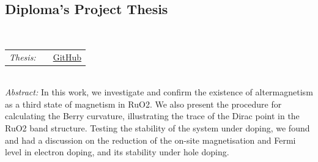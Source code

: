 \documentclass[letterpaper,11pt]{article}
\begin{document}
\subsection*{Diploma's Project Thesis}
\vspace{-5pt}
\hspace{0.5cm}{Altermagnetism in RuO\(_2\)}\\
\hspace{0.6cm}\begin{tabular}{l c r}
	\textit{Thesis: } & \hspace{0.2cm} \null& \href{https://github.com/VCDPhuong/Diploma-Thesis/blob/main/Thesis.pdf}{\faGithub \hspace{.5pt}\color{blue}GitHub}\\
\end{tabular}\\
\hspace{0.6cm}\textit{Abstract: }In this work, we investigate and confirm the existence of altermagnetism as a third state of magnetism in RuO2. We also present the procedure for calculating the Berry curvature, illustrating the trace of the Dirac point in the RuO2 band structure. Testing the stability of the system under doping, we found and had a discussion on the reduction of the on-site magnetisation and Fermi level in electron doping, and its stability under hole doping.
\end{document}
